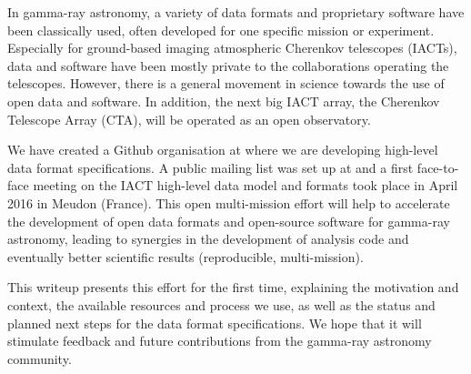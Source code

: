 In gamma-ray astronomy, a variety of data formats and proprietary software have been classically used, often developed for one specific mission or experiment. Especially for ground-based imaging atmospheric Cherenkov telescopes (IACTs), data and software have been mostly private to the collaborations operating the telescopes. However, there is a general movement in science towards the use of open data and software. In addition, the next big IACT array, the Cherenkov Telescope Array (CTA), will be operated as an open observatory.

We have created a Github organisation at \ogragithub where we are developing high-level data format specifications. A public mailing list was set up at \ogralist and a first face-to-face meeting on the IACT high-level data model and formats took place in April 2016 in Meudon (France). This open multi-mission effort will help to accelerate the development of open data formats and open-source software for gamma-ray astronomy, leading to synergies in the development of analysis code and eventually better scientific results (reproducible, multi-mission).

This writeup presents this effort for the first time, explaining the motivation and context, the available resources and process we use, as well as the status and planned next steps for the data format specifications. We hope that it will stimulate feedback and future contributions from the gamma-ray astronomy community.
